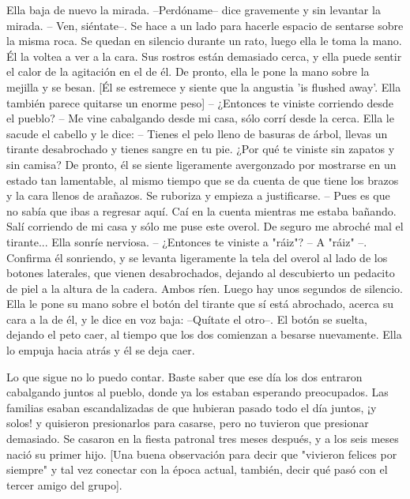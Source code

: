 Ella baja de nuevo la mirada. --Perdóname-- dice gravemente y sin levantar la mirada. -- Ven, siéntate--. Se hace a un lado para hacerle espacio de sentarse sobre la misma roca. Se quedan en silencio durante un rato, luego ella le toma la mano. Él la voltea a ver a la cara. Sus rostros están demasiado cerca, y ella puede sentir el calor de la agitación en el de él. De pronto, ella le pone la mano sobre la mejilla y se besan. [Él se estremece y siente que la angustia 'is flushed away'. Ella también parece quitarse un enorme peso]
-- ¿Entonces te viniste corriendo desde el pueblo?
-- Me vine cabalgando desde mi casa, sólo corrí desde la cerca.
Ella le sacude el cabello y le dice:
-- Tienes el pelo lleno de basuras de árbol, llevas un tirante desabrochado y tienes sangre en tu pie. ¿Por qué te viniste sin zapatos y sin camisa?
De pronto, él se siente ligeramente avergonzado por mostrarse en un estado tan lamentable, al mismo tiempo que se da cuenta de que tiene los brazos y la cara llenos de arañazos. Se ruboriza y empieza a justificarse.
-- Pues es que no sabía que ibas a regresar aquí. Caí en la cuenta mientras me estaba bañando. Salí corriendo de mi casa y sólo me puse este overol. De seguro me abroché mal el tirante...
Ella sonríe nerviosa.
-- ¿Entonces te viniste a "ráiz"?
-- A "ráiz" --. Confirma él sonriendo, y se levanta ligeramente la tela del overol al lado de los botones laterales, que vienen desabrochados, dejando al descubierto un pedacito de piel a la altura de la cadera. Ambos ríen. Luego hay unos segundos de silencio. Ella le pone su mano sobre el botón del tirante que sí está abrochado, acerca su cara a la de él, y le dice en voz baja: --Quítate el otro--. El botón se suelta, dejando el peto caer, al tiempo que los dos comienzan a besarse nuevamente. Ella lo empuja hacia atrás y él se deja caer.

Lo que sigue no lo puedo contar. Baste saber que ese día los dos entraron cabalgando juntos al pueblo, donde ya los estaban esperando preocupados. Las familias esaban escandalizadas de que hubieran pasado todo el día juntos, ¡y solos! y quisieron presionarlos para casarse, pero no tuvieron que presionar demasiado. Se casaron en la fiesta patronal tres meses después, y a los seis meses nació su primer hijo. [Una buena observación para decir que "vivieron felices por siempre" y tal vez conectar con la época actual, también, decir qué pasó con el tercer amigo del grupo].